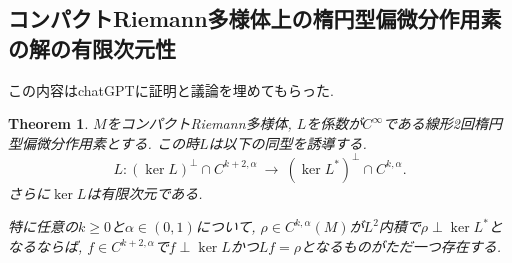 \documentclass[dvipdfmx,a4paper,11pt]{article} %
\newtheorem{thm}{Theorem}[section]
\theoremstyle{definition}
\theoremstyle{remark}
\numberwithin{equation}{section}
\begin{document}
\subsection{コンパクトRiemann多様体上の楕円型偏微分作用素の解の有限次元性}
この内容はchatGPTに証明と議論を埋めてもらった. 


\begin{thm}
\label{thm-fredholm}
$M$をコンパクトRiemann多様体, 
 $L$を係数が$C^\infty$である線形2回楕円型偏微分作用素とする.
 この時$L$は以下の同型を誘導する.
\[
L\colon (\ker L)^\perp\cap C^{k+2,\alpha}\ \to\ (\ker L^*)^\perp\cap C^{k,\alpha}.
\]
さらに$\ker L$は有限次元である. 

特に任意の$k\geq 0$と$\alpha\in(0,1)$について, 
$\rho\in C^{k,\alpha}(M)$が$L^2$内積で$\rho\perp \ker L^*$となるならば, 
$f\in C^{k+2,\alpha}$で$f\perp \ker L$かつ$Lf=\rho$となるものがただ一つ存在する. 
\end{thm}
\end{document}
